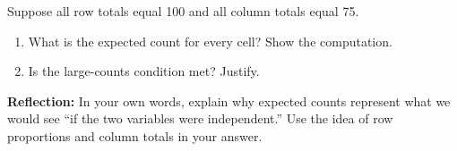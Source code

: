 \documentclass[10pt]{article}
\begin{document}
\begin{enumerate}
        \vspace{0.1in}
        Suppose all row totals equal 100 and all column totals equal 75.

        \begin{enumerate}[label=\alph*.]
            \item What is the expected count for every cell? Show the computation.


            \item Is the large-counts condition met? Justify.

        \end{enumerate}

\end{enumerate}

\begin{reflectionbox}
\textbf{Reflection:} In your own words, explain why expected counts represent what we
would see ``if the two variables were independent.'' Use the idea of row proportions
and column totals in your answer.

\end{reflectionbox}
\end{document}
